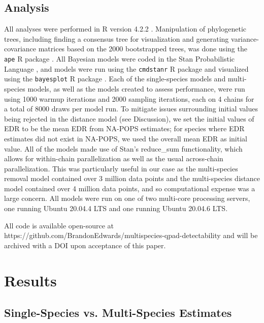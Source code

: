\documentclass[12pt]{article}
\begin{document}
\subsection{Analysis}
\par All analyses were performed in R version 4.2.2 \citep{r_core_team_r_2022}.
Manipulation of phylogenetic trees, including finding a consensus tree for visualization and generating variance-covariance matrices based on the 2000 bootstrapped trees, was done using the \texttt{ape} R package \citep{paradis_ape_2019}.
All Bayesian models were coded in the Stan Probabilistic Language \cite{stan_development_team_stan_2019}, and models were run using the \texttt{cmdstanr} R package \citep{gabry_cmdstanr_2022} and visualized using the \texttt{bayesplot} R package \citep{gabry_visualization_2019}.
Each of the single-species models and multi-species models, as well as the models created to assess performance, were run using 1000 warmup iterations and 2000 sampling iterations, each on 4 chains for a total of 8000 draws per model run.
To mitigate issues surrounding initial values being rejected in the distance model (see Discussion), we set the initial values of EDR to be the mean EDR from NA-POPS \citep{edwards_point_2023} estimates; for species where EDR estimates did not exist in NA-POPS, we used the overall mean EDR as initial value.
All of the models made use of Stan's reduce\_sum functionality, which allows for within-chain parallelization as well as the usual across-chain parallelization.
This was particularly useful in our case as the multi-species removal model contained over 3 million data points and the multi-species distance model contained over 4 million data points, and so computational expense was a large concern.
All models were run on one of two multi-core processing servers, one running Ubuntu 20.04.4 LTS and one running Ubuntu 20.04.6 LTS.

\par All code is available open-source at https://github.com/BrandonEdwards/multispecies-qpad-detectability and will be archived with a DOI upon acceptance of this paper.


\section{Results}

\subsection{Single-Species vs. Multi-Species Estimates}
\end{document}
